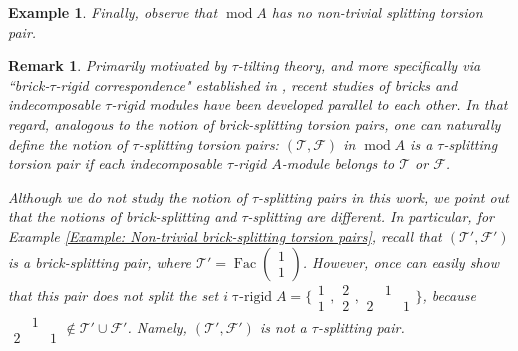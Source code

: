 \documentclass{amsart}
\theoremstyle{thmstyle}
\theoremstyle{exstyle}
\newtheorem{example}[thm]{Example}
\theoremstyle{defstyle}
\theoremstyle{remstyle}
\newtheorem{remark}[thm]{Remark}
\theoremstyle{remstyle}
\newcommand{\Fac}{\operatorname{Fac}}
\newcommand{\taurigid}{\operatorname{\tau-rigid}}
\DeclareMathOperator*{\modu}{mod}
\begin{document}
\begin{example}
Finally, observe that $\modu A$ has no non-trivial splitting torsion pair. 
\end{example} 

\begin{remark}
Primarily motivated by $\tau$-tilting theory, and more specifically via ``brick-$\tau$-rigid correspondence" established in \cite{DIJ}, recent studies of bricks and indecomposable $\tau$-rigid modules have been developed parallel to each other. In that regard, analogous to the notion of brick-splitting torsion pairs, one can naturally define the notion of $\tau$-splitting torsion pairs: $(\mathcal{T},\mathcal{F})$ in $\modu A$ is a \emph{$\tau$-splitting} torsion pair if each indecomposable $\tau$-rigid $A$-module belongs to $\mathcal{T}$ or $\mathcal{F}$.

Although we do not study the notion of $\tau$-splitting pairs in this work, we point out that the notions of brick-splitting and $\tau$-splitting are different. 
In particular, for Example \ref{Example: Non-trivial brick-splitting torsion pairs}, recall that $(\mathcal{T}', \mathcal{F}')$ is a brick-splitting pair, where $\mathcal{T}'=\Fac({\begin{smallmatrix} 1\\1\end{smallmatrix}})$. However, once can easily show that this pair does not split the set $\textit{i}\taurigid A=\{ {\begin{smallmatrix} 1\\1\end{smallmatrix}},{\begin{smallmatrix} 2\\2\end{smallmatrix}}, {\begin{smallmatrix} & 1& \\2& &1\end{smallmatrix}} \}$, because ${\begin{smallmatrix} & 1& \\2& &1\end{smallmatrix}} \notin \mathcal{T}'\cup \mathcal{F}'$. Namely, $(\mathcal{T}', \mathcal{F}')$ is not a $\tau$-splitting pair.
\end{remark}
\end{document}
